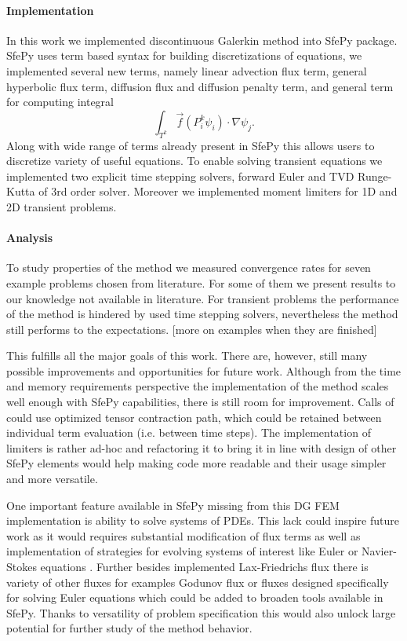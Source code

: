 \paragraph{Implementation}
In this work we implemented discontinuous Galerkin method into SfePy package. 
SfePy uses term based syntax for building discretizations of equations, we implemented 
several new terms, namely linear advection flux term, general hyperbolic flux term, 
diffusion flux and diffusion penalty term, and general term for computing integral
$$
\int_{T^k} \vec{f}(P_i^k\psi_i)\cdot\nabla\psi_j. 
$$
Along with wide range of terms already present in SfePy this allows users to 
discretize variety of useful equations. To enable solving transient equations we 
implemented two explicit time stepping solvers, forward Euler and TVD Runge-Kutta of 3rd 
order solver. Moreover we implemented moment limiters for 1D and 2D transient 
problems.

\paragraph{Analysis}
To study properties of the method we measured convergence rates for seven 
example 
problems chosen from literature. For some of them we present results to our 
knowledge not 
available in literature. For transient problems the performance of the method 
is hindered 
by used time stepping solvers, nevertheless the method still performs to the 
expectations.
[\todo more on examples when they are finished]

This fulfills all the major goals of this work. There are, however, still many possible 
improvements and opportunities for future work. Although from the time and memory 
requirements perspective the implementation of the method scales well enough with SfePy 
capabilities, there is still room for improvement. Calls of  could 
use optimized tensor contraction path, which could be retained between individual term 
evaluation (i.e. between time steps). The implementation of limiters is rather ad-hoc and 
refactoring it to bring it in line with design of other SfePy elements would help making 
code more readable and their usage simpler and more versatile. 

One important feature available in SfePy missing from this DG FEM 
implementation is ability to solve systems of PDEs. This lack could inspire future work 
as it would requires substantial modification of flux terms as well as implementation of  
strategies for evolving systems of interest like Euler or Navier-Stokes 
equations \cite{Hesthaven2008}. Further besides implemented Lax-Friedrichs flux there is 
variety of other fluxes for examples Godunov flux \cite{DiPietro2012} or fluxes designed 
specifically for solving Euler equations \cite[Section 3.3]{Kucera} which could be added 
to broaden tools available in SfePy. Thanks to versatility of problem specification this 
would also unlock large potential for further study of the method behavior. 
